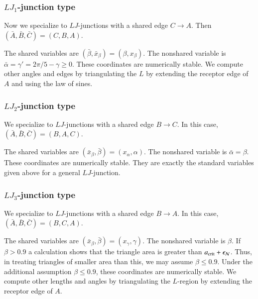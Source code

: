 
\subsubsection{$LJ_1$-junction type}

Now we specialize to $LJ$-junctions with a shared edge $C\to A$.
Then $(\bar A,\bar B,\bar C)=(C,B,A)$.

The shared variables are $(\bar \beta,\bar x_\beta)=(\beta,x_\beta)$.
The nonshared variable is $\bar\alpha=\gamma' = 2\pi/5-\gamma\ge0$.
These coordinates are numerically stable.  We compute other angles and
edges by triangulating the $L$ by extending the receptor edge of $A$
and using the law of sines.

\subsubsection{$LJ_2$-junction type}

We specialize to $LJ$-junctions with a shared edge $B\to C$.
In this case, $(\bar A,\bar B,\bar C)=(B,A,C)$.

The shared variables are $(\bar x_\beta,\bar\beta)=(x_\alpha,\alpha)$.
The nonshared variable is $\bar\alpha=\beta$.  These coordinates are
numerically stable.  They are exactly the standard variables given
above for a general $LJ$-junction.

\subsubsection{$LJ_3$-junction type}

We specialize to $LJ$-junctions with a shared edge $B\to A$.
In this case, $(\bar A,\bar B,\bar C)=(B,C,A)$.

The shared variables are $(\bar x_\beta,\bar\beta)=(x_\gamma,\gamma)$.
The nonshared variable is $\beta$.  If $\beta > 0.9$ a
calculation shows that the triangle area is greater
than $a_\text{crit}+\epsilon_{\mathcal N}$. Thus, in treating triangles of smaller area than this,
we may assume
$\beta\le0.9$.  
Under the additional assumption $\beta\le0.9$, these coordinates
are numerically stable.  We
compute other lengths and angles by triangulating the $L$-region by
extending the receptor edge of $A$.

